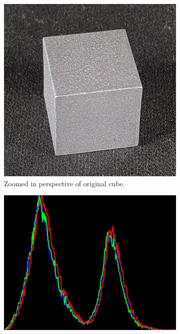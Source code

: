 \begin{figure}[H]
    \centering
    \begin{subfigure}[b]{0.3\textwidth}
         \includegraphics[width=\textwidth]{figures/202105/original-cube-close.jpg}
         \caption{Zoomed in perspective of original cube.}
         \label{fig:original-cube-close-image}
    \end{subfigure}
    \begin{subfigure}[b]{0.4\textwidth}
         \includegraphics[width=\textwidth]{figures/202105/original-cube-close-hist.jpg}

\end{subfigure}
\end{figure}
